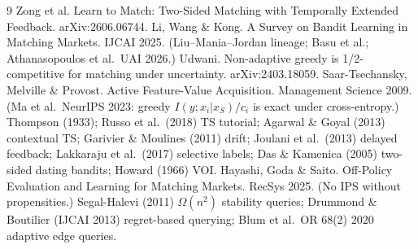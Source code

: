 \documentclass[11pt,a4paper]{article}
\begin{document}
\begin{thebibliography}{9}
 Zong et al. Learn to Match: Two-Sided Matching with
Temporally Extended Feedback. arXiv:2606.06744.
 Li, Wang \& Kong. A Survey on Bandit Learning in
Matching Markets. IJCAI 2025. (Liu--Mania--Jordan lineage; Basu et al.;
Athanasopoulos et al.\ UAI 2026.)
 Udwani. Non-adaptive greedy is 1/2-competitive for matching
under uncertainty. arXiv:2403.18059.
 Saar-Tsechansky, Melville \& Provost. Active Feature-Value
Acquisition. Management Science 2009. (Ma et al.\ NeurIPS 2023: greedy
$I(y;x_i|x_S)/c_i$ is exact under cross-entropy.)
 Thompson (1933); Russo et al.\ (2018) TS tutorial;
Agarwal \& Goyal (2013) contextual TS; Garivier \& Moulines (2011) drift;
Joulani et al.\ (2013) delayed feedback; Lakkaraju et al.\ (2017) selective
labels; Das \& Kamenica (2005) two-sided dating bandits; Howard (1966) VOI.
 Hayashi, Goda \& Saito. Off-Policy Evaluation and Learning for
Matching Markets. RecSys 2025. (No IPS without propensities.)
 Segal-Halevi (2011) $\Omega(n^2)$ stability queries;
Drummond \& Boutilier (IJCAI 2013) regret-based querying; Blum et al.\ OR
68(2) 2020 adaptive edge queries.
\end{thebibliography}
\end{document}
